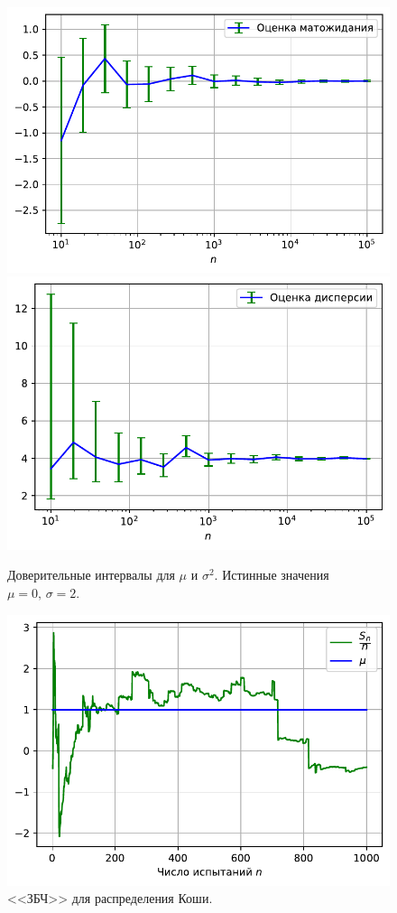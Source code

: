 \documentclass[16pt]{article}
\begin{document}
\begin{figure}[h]
	\center
	\includegraphics[scale=0.5]{5_3.pdf}
	\hfill
	\includegraphics[scale=0.5]{5_4.pdf}
	\caption{Доверительные интервалы для $\mu$ и $\sigma^2$. Истинные значения $\mu = 0,\, \sigma = 2$.}
\end{figure}

\begin{figure}[h]
	\center
	\includegraphics[scale=0.7]{5_5.pdf}
	\caption{<<ЗБЧ>> для распределения Коши.}
\end{figure}
\end{document}

